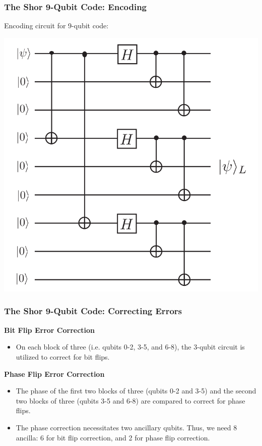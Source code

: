 \documentclass{beamer}
\begin{document}
\begin{frame}
    \frametitle{The Shor 9-Qubit Code: Encoding}
        Encoding circuit for 9-qubit code:
        
        \begin{center}
        \includegraphics[scale=0.7]{9qbencoding.PNG}
        \end{center}
\end{frame}

\begin{frame}
    \frametitle{The Shor 9-Qubit Code: Correcting Errors}
    \textbf{Bit Flip Error Correction}
        \begin{itemize}
            \item On each block of three (i.e. qubits 0-2, 3-5, and 6-8), the 3-qubit circuit is utilized to correct for bit flips.
        \end{itemize}
        \textbf{Phase Flip Error Correction}
        \begin{itemize}
            \item The phase of the first two blocks of three (qubits 0-2 and 3-5) and the second two blocks of three (qubits 3-5 and 6-8) are compared to correct for phase flips.
            \item The phase correction necessitates two ancillary qubits. Thus, we need 8 ancilla: 6 for bit flip correction, and 2 for phase flip correction.
        \end{itemize}
\end{frame}
\end{document}
